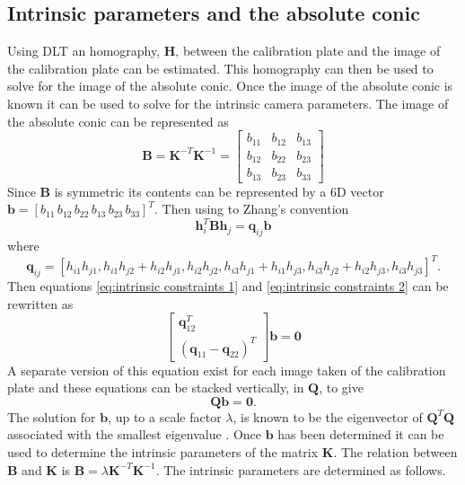 \documentclass[12pt,oneside,openany,a4paper, %
english, %
masters-t, goldenblock]{usthesis}
\begin{document}
\subsection{Intrinsic parameters and the absolute conic}
\label{sec: parameters and the absolute conic}
Using DLT an homography, $\bm{H}$, between the calibration plate and the image of the calibration plate can be estimated. This homography can then be used to solve for the image of the absolute conic. Once the image of the absolute conic is known it can be used to solve for the intrinsic camera parameters. The image of the absolute conic can be represented as
\begin{equation}
  \bm{B} = \bm{K}^{-T} \bm{K}^{-1} = 
  \begin{bmatrix}
  b_{11} & b_{12} & b_{13}\\
  b_{12} & b_{22} & b_{23} \\
  b_{13} & b_{23} & b_{33}
  \end{bmatrix}
\end{equation}
Since $\bm{B}$ is symmetric its contents can be represented by a 6D vector $\bm{b}=[b_{11} \, b_{12} \, b_{22} \, b_{13} \, b_{23} \, b_{33}]^T$. Then using to Zhang's convention \cite{emerging}
\begin{equation}
  \bm{h}_i^T \bm{B} \bm{h}_j = \bm{q}_{ij} \bm{b}
\end{equation}
where 
\begin{equation}
  \bm{q}_{ij} = [ h_{i1} h_{j1}, h_{i1} h_{j2} + h_{i2} h_{j1}, h_{i2} h_{j2}, h_{i3} h_{j1} + h_{i1} h_{j3}, h_{i3} h_{j2} + h_{i2} h_{j3}, h_{i3} h_{j3}]^T.
\end{equation}
Then equations \ref{eq:intrinsic constraints 1} and \ref{eq:intrinsic constraints 2} can be rewritten as 
\begin{equation}
  \begin{bmatrix} 
  \bm{q}_{12}^T \\
  ( \bm{q}_{11} - \bm{q}_{22})^T
  \end{bmatrix} \bm{b} = \bm{0}
\end{equation}
A separate version of this equation exist for each image taken of the calibration plate and these equations can be stacked vertically, in $\bm{Q}$, to give
\begin{equation}
  \bm{Q}\bm{b}=\bm{0}.
\end{equation}
The solution for $\bm{b}$, up to a scale factor $\lambda$, is known to be the eigenvector of $\bm{Q}^T\bm{Q}$ associated with the smallest eigenvalue \cite{emerging}. Once $\bm{b}$ has been determined it can be used to determine the intrinsic parameters of the matrix $\bm{K}$. The relation between $\bm{B}$ and $\bm{K}$ is $\bm{B}=\lambda \bm{K}^{-T} \bm{K}^{-1}$. The intrinsic parameters are determined as follows.
\end{document}
